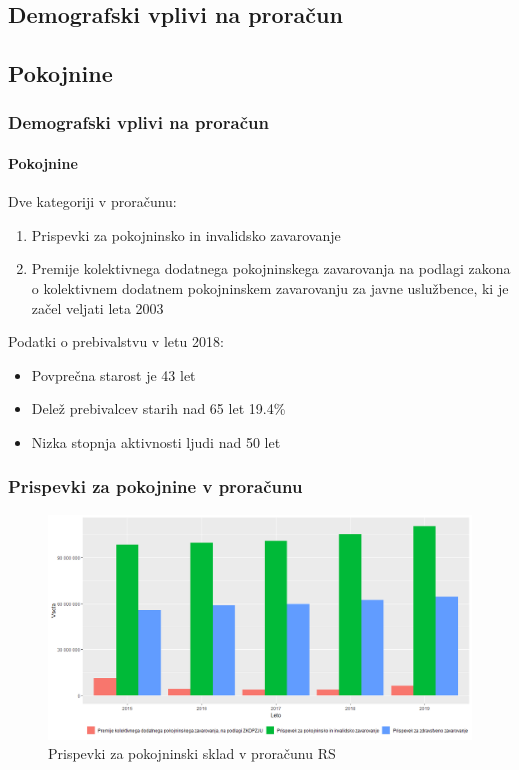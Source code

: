 \documentclass[10pt]{beamer}
\begin{document}
\begin{frame}
	\section[Demografski vplivi na proračun]{Demografski vplivi na proračun}
	\subsection[Pokojnine]{Pokojnine}
	\frametitle{Demografski vplivi na proračun}
	\framesubtitle{Pokojnine}
	Dve kategoriji v proračunu:
		\begin{enumerate}
			\item Prispevki za pokojninsko in invalidsko zavarovanje
			\item Premije kolektivnega dodatnega pokojninskega zavarovanja na podlagi zakona o kolektivnem dodatnem pokojninskem zavarovanju za javne uslužbence, ki je začel veljati leta 2003
		\end{enumerate}
	
	Podatki o prebivalstvu v letu 2018:
	\begin{itemize}
		\item Povprečna starost je 43 let
		\item Delež prebivalcev starih nad 65 let 19.4\%
		\item Nizka stopnja aktivnosti ljudi nad 50 let
	\end{itemize}
\end{frame}

\begin{frame}
	\frametitle{Prispevki za pokojnine v proračunu}
	\begin{figure}[h]
	\centering
	\includegraphics[width = 10 cm]{prispevki_delodajalcev_za_socialno_varnost_graf.png}
	\caption{Prispevki za pokojninski sklad v proračunu RS}
	\label{Slika 3}
	\end{figure}
\end {frame}
\end{document}
